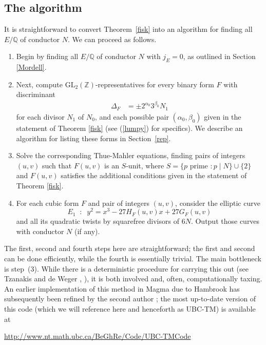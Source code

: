 \subsection{The algorithm}
It is straightforward to convert Theorem~\ref{fisk} into an algorithm for finding all $E/\mathbb{Q}$ of conductor $N$. We can proceed as follows.
\begin{enumerate}
\item Begin by finding all $E/\mathbb{Q}$ of conductor $N$ with $j_E=0$, as outlined in Section \ref{Mordell}.
\item Next, compute $\mbox{GL}_2(\mathbb{Z})$-representatives for every binary form $F$ with discriminant
\begin{align*}
\Delta_F &= \pm 2^{\alpha_0} 3^{\beta_0} N_1
\end{align*}
for each divisor $N_1$ of $N_0$, and each possible pair $(\alpha_0,\beta_0)$ given in the statement of Theorem 
\ref{fisk} (see (\ref{lumpy}) for specifics). We describe an algorithm for listing these forms in Section~\ref{rep}. 
\item Solve the corresponding Thue-Mahler equations, finding pairs of integers $(u,v)$ such that
$F(u,v)$ is an $S$-unit, where $S = \{ p \mbox{ prime } : p \mid N \} \cup \{2 \}$ and $F(u,v)$ satisfies the additional conditions given in the statement of Theorem 
\ref{fisk}.
\item For each cubic form $F$ and pair of integers $(u,v)$, consider the elliptic curve
$$
E_1 \; \; : \; \; y^2 = x^3 -27 H_F(u,v) x +27 G_F(u,v)
$$
and all its quadratic twists by squarefree divisors of $6N$. Output those curves with conductor $N$ (if any).
\end{enumerate}
The first, second and fourth steps here are straightforward; the first and second can be done efficiently, while the fourth is essentially 
trivial. The main bottleneck is step~(3). While there is a deterministic procedure for carrying this out (see Tzanakis and de 
Weger \cite{TW2}, \cite{TW3}), it is both involved and, often, computationally taxing. An earlier  implementation of this method in Magma due to Hambrook \cite{Ham} has subsequently been refined by the second author \cite{Ghe}; the most up-to-date version of this code (which we will reference here and henceforth as UBC-TM) is available at 
\begin{center}
\url{http://www.nt.math.ubc.ca/BeGhRe/Code/UBC-TMCode}
\end{center}

